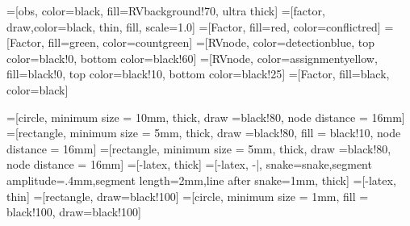 \usetikzlibrary{shapes}
\usetikzlibrary{calc}
\usetikzlibrary{positioning}
\usetikzlibrary{bayesnet}
\usetikzlibrary{snakes}
\usetikzlibrary{backgrounds}
\usetikzlibrary{patterns}
\usetikzlibrary{matrix}
\usetikzlibrary{fit}
\usetikzlibrary{calc}
\usetikzlibrary{shadows}
\usetikzlibrary{plotmarks}
\usetikzlibrary{decorations.pathreplacing}
\usetikzlibrary{shapes.misc}




=[obs, color=black, fill=RVbackground!70, ultra thick]
=[factor, draw,color=black, thin, fill, scale=1.0]
=[Factor, fill=red, color=conflictred]
=[Factor, fill=green, color=countgreen]
=[RVnode, color=detectionblue, top color=black!0, bottom color=black!60]
=[RVnode, color=assignmentyellow, fill=black!0, top color=black!10, bottom color=black!25]
=[Factor, fill=black, color=black]


=[circle, minimum size = 10mm, thick, draw =black!80, node distance = 16mm]
=[rectangle, minimum size = 5mm, thick, draw =black!80, fill = black!10, node distance = 16mm]
=[rectangle, minimum size = 5mm, thick, draw =black!80, node distance = 16mm]
=[-latex, thick]
=[-latex, -|, snake=snake,segment amplitude=.4mm,segment length=2mm,line after snake=1mm, thick]
=[-latex, thin]
=[rectangle, draw=black!100]
=[circle, minimum size = 1mm, fill = black!100, draw=black!100]


